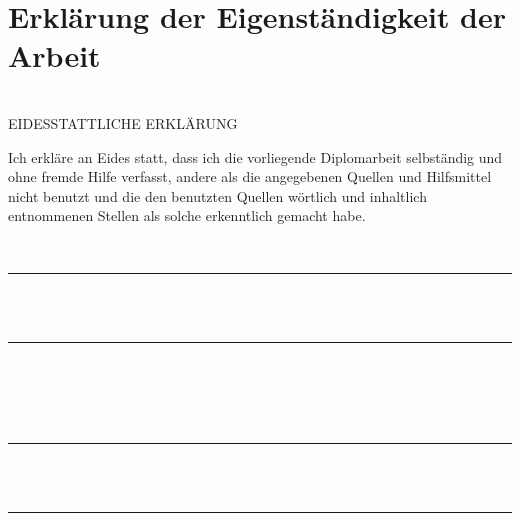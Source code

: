 \documentclass[12pt,a4paper]{article}
\newcommand{\mylinespacing}[0]{\onehalfspace}	%
\begin{document}
\mylinespacing
{




\newpage%

\setcounter{section}{1000}
\renewcommand\thesection{i}
\renewcommand\thesubsection{\thesection.\roman{subsection}}
\renewcommand\thesubsubsection{\thesubsection.\roman{subsubsection}}
\section*{Erklärung der Eigenständigkeit der Arbeit}
	\hfill\\[ 8mm]
	EIDESSTATTLICHE ERKLÄRUNG
	\\[3mm]
\begin{spacing}{1.5}
	\noindent%
	Ich erkläre an Eides statt, dass ich die vorliegende Diplomarbeit selbständig und
	ohne fremde Hilfe verfasst, andere als die angegebenen Quellen und Hilfsmittel
	nicht benutzt und die den benutzten Quellen wörtlich und inhaltlich entnommenen
	Stellen als solche erkenntlich gemacht habe.
\end{spacing}\hfill
	\\[12mm]
	\parbox[b]{52mm}{
		\rule{50mm}{0.2pt}\rule{0pt}{25mm}
		\\\hspace*{6mm}{Ort, Datum}
		\\[0mm]
	}
	\hfill
	\parbox[b]{72mm}{
		\rule{70mm}{0.2pt}\rule{0pt}{25mm}
		\\\hspace*{6mm}{Verfasser, Verfasserinnen}
		\\\hspace*{6mm}{Vor- und Zunamen}
	}
		\\[12mm]
	\parbox[b]{52mm}{
		\rule{50mm}{0.2pt}\rule{0pt}{25mm}
		\\\hspace*{6mm}{Ort, Datum}
		\\[0mm]
	}
	\hfill
	\parbox[b]{72mm}{
		\rule{70mm}{0.2pt}\rule{0pt}{25mm}
		\\\hspace*{6mm}{Verfasser, Verfasserinnen}
		\\\hspace*{6mm}{Vor- und Zunamen}
	}






}
\end{document}
